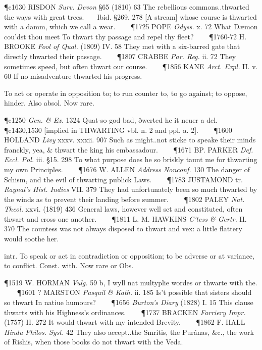 \begin{description}[wide, labelwidth=!, labelindent=0pt]
\begin{myenumerate}
\P c1630 RISDON \textit{Surv. Devon} §65 (1810) 63 The rebellious commons..thwarted the ways with great trees.    Ibid. §269. 278 [A stream] whose course is thwarted with a damm, which we call a wear.    
\P 1725 POPE  \textit{Odyss.} x. 72 What Dæmon cou'dst thou meet To thwart thy passage and repel thy fleet?    
\P 1760-72 H. BROOKE  \textit{Fool of Qual.} (1809) IV. 58 They met with a six-barred gate that directly thwarted their passage.    
\P 1807 CRABBE  \textit{Par. Reg.} ii. 72 They sometimes speed, but often thwart our course.    
\P 1856 KANE  \textit{Arct. Expl.} II. v. 60 If no misadventure thwarted his progress.

 To act or operate in opposition to; to run counter to, to go against; to oppose, hinder. Also absol. Now rare.

\P c1250 \textit{Gen. \& Ex.} 1324 Quat-so  god bad, ðwerted he it neuer a del.    
\P c1430,1530 [implied in  THWARTING vbl. n. 2 and ppl. a. 2].    
\P 1600 HOLLAND  \textit{Livy} xxxv. xxxii. 907 Such as might..not sticke to speake their minds franckly, yea, \& thwart the king his embassadour.    
\P 1671 BP. PARKER  \textit{Def. Eccl. Pol.} iii. §15. 298 To what purpose does he so briskly taunt me for thwarting my own Principles.    
\P 1676 W. ALLEN  \textit{Address Nonconf.} 130 The danger of Schism, and the evil of thwarting publick Laws.    
\P 1783 JUSTAMOND tr.  \textit{Raynal's Hist. Indies} VII. 379 They had unfortunately been so much thwarted by the winds as to prevent their landing before summer.    
\P 1802 PALEY  \textit{Nat. Theol.} xxvi. (1819) 436 General laws, however well set and constituted, often thwart and cross one another.    
\P 1811 L. M. HAWKINS  \textit{C'tess \& Gertr.} II. 370 The countess was not always disposed to thwart and vex: a little flattery would soothe her.

 intr. To speak or act in contradiction or opposition; to be adverse or at variance, to conflict. Const. with. Now rare or Obs.

\P 1519 W. HORMAN  \textit{Vulg.} 59 b, I wyll nat multyplie wordes or thwarte with the.    
\P 1601 ? MARSTON  \textit{Pasquil \& Kath.} ii. 185 Is't possible that sisters should so thwart In natiue humours?    
\P 1656 \textit{Burton's  Diary} (1828) I. 15 This clause thwarts with his Highness's ordinances.    
\P 1737 BRACKEN  \textit{Farriery Impr.} (1757) II. 272 It would thwart with my intended Brevity.    
\P 1862 F. HALL  \textit{Hindu Philos. Syst.} 42 They also accept..the Smritis, the Puránas, \&c., the work of Rishis, when those books do not thwart with the Veda.


\end{myenumerate}
\end{description}
